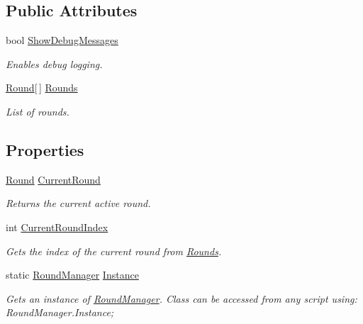 \subsection*{Public Attributes}
\begin{DoxyCompactItemize}
\item 
bool \hyperlink{class_round_manager_1_1_round_manager_a3c6edeb40fd89225aad834d63a08f4d3}{Show\+Debug\+Messages}
\begin{DoxyCompactList}\small\item\em Enables debug logging. \end{DoxyCompactList}\item 
\hyperlink{class_round_manager_1_1_round}{Round}\mbox{[}$\,$\mbox{]} \hyperlink{class_round_manager_1_1_round_manager_aca52a7d7a2dc064d0db460fc1292a297}{Rounds}
\begin{DoxyCompactList}\small\item\em List of rounds. \end{DoxyCompactList}\end{DoxyCompactItemize}
\subsection*{Properties}
\begin{DoxyCompactItemize}
\item 
\hyperlink{class_round_manager_1_1_round}{Round} \hyperlink{class_round_manager_1_1_round_manager_ac51a28cf2f8981abda04a02a01a06d4f}{Current\+Round}
\begin{DoxyCompactList}\small\item\em Returns the current active round. \end{DoxyCompactList}\item 
int \hyperlink{class_round_manager_1_1_round_manager_a23c76c88e03e7150362ab75ec995df50}{Current\+Round\+Index}
\begin{DoxyCompactList}\small\item\em Gets the index of the current round from \hyperlink{class_round_manager_1_1_round_manager_aca52a7d7a2dc064d0db460fc1292a297}{Rounds}. \end{DoxyCompactList}\item 
static \hyperlink{class_round_manager_1_1_round_manager}{Round\+Manager} \hyperlink{class_round_manager_1_1_round_manager_a342eec1453f6fbc73e9eac8cdc722cb3}{Instance}
\begin{DoxyCompactList}\small\item\em Gets an instance of \hyperlink{class_round_manager_1_1_round_manager}{Round\+Manager}. Class can be accessed from any script using\+: Round\+Manager.\+Instance; \end{DoxyCompactList}\end{DoxyCompactItemize}


